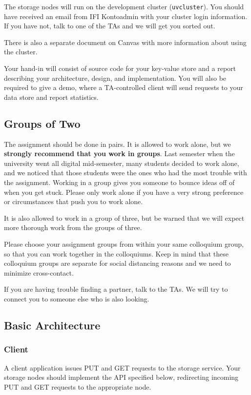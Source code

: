 \documentclass[a4paper]{article}
\begin{document}
The storage nodes will run on the development cluster (\texttt{uvcluster}).
You should have received an email from IFI Kontoadmin with your cluster login information.
If you have not, talk to one of the TAs and we will get you sorted out.

There is also a separate document on Canvas with more information about using the cluster.

Your hand-in will consist of source code for your key-value store
and
a report describing your architecture, design, and implementation.
You will also be required to give a demo,
where a TA-controlled client will send requests to your data store
and report statistics.

\subsection{Groups of Two}

The assignment should be done in pairs. It is allowed to work alone, but we \textbf{strongly recommend that you work in groups}. Last semester when the university went all digital mid-semester, many students decided to work alone, and we noticed that those students were the ones who had the most trouble with the assignment. Working in a group gives you someone to bounce ideas off of when you get stuck. Please only work alone if you have a very strong preference or circumstances that push you to work alone.

It is also allowed to work in a group of three, but be warned that we will expect more thorough work from the groups of three.

Please choose your assignment groups from within your same colloquium group, so that you can work together in the colloquiums. Keep in mind that these colloquium groups are separate for social distancing reasons and we need to minimize cross-contact.

If you are having trouble finding a partner, talk to the TAs.
We will try to connect you to someone else who is also looking.

\subsection{Basic Architecture}

\subsubsection{Client}
A client application issues PUT and GET requests to the storage service.
Your storage nodes should implement the API specified below,
redirecting incoming PUT and GET requests to the appropriate node.
\end{document}
